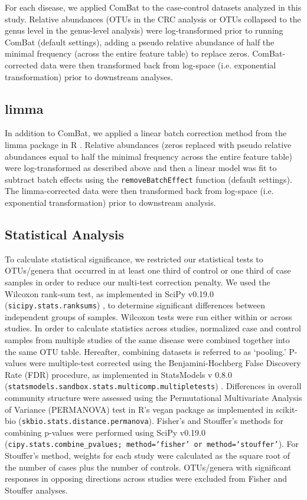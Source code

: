 For each disease, we applied ComBat \cite{8} to the case-control datasets analyzed in this study.
Relative abundances (OTUs in the CRC analysis or OTUs collapsed to the genus level in the genus-level analysis) were log-transformed prior to running ComBat (default settings), adding a pseudo relative abundance of half the minimal frequency (across the entire feature table) to replace zeros.
ComBat-corrected data were then transformed back from log-space (i.e. exponential transformation) prior to downstream analyses.

\subsection{limma}

In addition to ComBat, we applied a linear batch correction method from the limma package in R \cite{5}.
Relative abundances (zeros replaced with pseudo relative abundances equal to half the minimal frequency across the entire feature table) were log-transformed as described above and then a linear model was fit to subtract batch effects using the \texttt{removeBatchEffect} function (default settings).
The limma-corrected data were then transformed back from log-space (i.e. exponential transformation) prior to downstream analysis.

\subsection{Statistical Analysis}

To calculate statistical significance, we restricted our statistical tests to OTUs/genera that occurred in at least one third of control or one third of case samples in order to reduce our multi-test correction penalty.
We used the Wilcoxon rank-sum test, as implemented in SciPy v0.19.0 (\texttt{sicipy.stats.ranksums}) \cite{40}, to determine significant differences between independent groups of samples.
Wilcoxon tests were run either within or across studies.
In order to calculate statistics across studies, normalized case and control samples from multiple studies of the same disease were combined together into the same OTU table.
Hereafter, combining datasets is referred to as `pooling.'
P-values were multiple-test corrected using the Benjamini-Hochberg False Discovery Rate (FDR) procedure, as implemented in StatsModels v 0.8.0 (\texttt{statsmodels.sandbox.stats.multicomp.multipletests}) \cite{41}.
Differences in overall community structure were assessed using the Permutational Multivariate Analysis of Variance (PERMANOVA) test in R's vegan package \cite{42} as implemented in scikit-bio (\texttt{skbio.stats.distance.permanova}).
Fisher's and Stouffer's methods for combining p-values were performed using SciPy v0.19.0 (\texttt{cipy.stats.combine\_pvalues; method=`fisher' or method=`stouffer'}).
For Stouffer's method, weights for each study were calculated as the square root of the number of cases plus the number of controls.
OTUs/genera with significant responses in opposing directions across studies were excluded from Fisher and Stouffer analyses.

